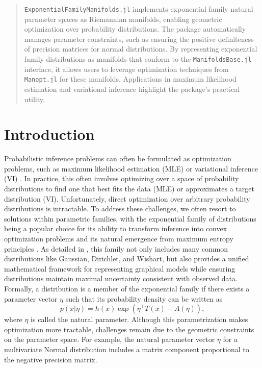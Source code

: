 \documentclass{juliacon}
\begin{document}


\maketitle
\begin{abstract}
\texttt{ExponentialFamilyManifolds.jl} implements exponential family natural parameter spaces as Riemannian manifolds, enabling geometric optimization over probability distributions. The package automatically manages parameter constraints, such as ensuring the positive definiteness of precision matrices for normal distributions. By representing exponential family distributions as manifolds that conform to the \texttt{ManifoldsBase.jl} interface, it allows users to leverage optimization techniques from \texttt{Manopt.jl} for these manifolds. Applications in maximum likelihood estimation and variational inference highlight the package's practical utility.
\end{abstract}

\section{Introduction}

Probabilistic inference problems can often be formulated as optimization problems, such as maximum likelihood estimation (MLE) or variational inference (VI) \cite{blei_variational_2017}. In practice, this often involves optimizing over a space of probability distributions to find one that best fits the data (MLE) or approximates a target distribution (VI). Unfortunately, direct optimization over arbitrary probability distributions is intractable. To address these challenges, we often resort to solutions within parametric families, with the exponential family of distributions being a popular choice for its ability to transform inference into convex optimization problems and its natural emergence from maximum entropy principles \cite{wainwright_graphical_2008}. As detailed in \cite[Chapter~3]{wainwright_graphical_2008}, this family not only includes many common distributions like Gaussian, Dirichlet, and Wishart, but also provides a unified mathematical framework for representing graphical models while ensuring distributions maintain maximal uncertainty consistent with observed data. Formally, a distribution is a member of the exponential family if there exists a parameter vector $\eta$ such that its probability density can be written as
\begin{equation*}\label{eq:exponential-family}
p(x|\eta) = h(x)\exp\left(\eta^\top T(x) - A(\eta)\right),
\end{equation*}
where $\eta$ is called the natural parameter. Although this parametrization makes optimization more tractable, challenges remain due to the geometric constraints on the parameter space. For example, the natural parameter vector $\eta$ for a multivariate Normal distribution includes a matrix component proportional to the negative precision matrix.
\end{document}
